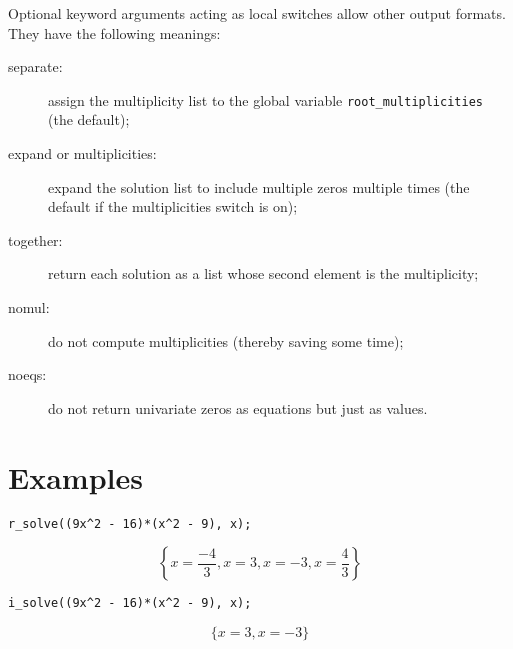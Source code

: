 \begin{sloppypar}
Optional keyword arguments acting as local switches allow other output
formats.  They have the following meanings:
\begin{description}
\item[{\ttfamily separate}:] assign the multiplicity list to the global
  variable \verb|root_multiplicities| (the default);
\item[{\ttfamily expand} or {\ttfamily multiplicities}:] expand the solution
  list to include multiple zeros multiple times (the default if the
  {\ttfamily multiplicities} switch is on);
\item[{\ttfamily together}:] return each solution as a list whose second
  element is the multiplicity;
\item[{\ttfamily nomul}:] do not compute multiplicities (thereby saving
  some time);
\item[{\ttfamily noeqs}:] do not return univariate zeros as equations but
  just as values.
\end{description}
\end{sloppypar}


\section{Examples}

\begin{verbatim}
r_solve((9x^2 - 16)*(x^2 - 9), x);
\end{verbatim}
\[
  \left\{x=\frac{-4}{3},x=3,x=-3,x=\frac{4}{3}\right\}
\]
\begin{verbatim}
i_solve((9x^2 - 16)*(x^2 - 9), x);
\end{verbatim}
\[
  \{x=3,x=-3\}
\]

